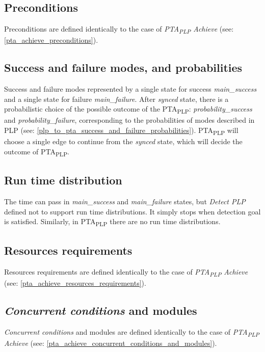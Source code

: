 \subsection{Preconditions}
Preconditions are defined identically to the case of \textit{PTA\textsubscript{PLP} Achieve} (see: \ref{pta_achieve_preconditions}).\\
\subsection{Success and failure modes, and probabilities}
Success and failure modes represented by a single state for success \textcolor{ColorUppaalState}{\textit{main_success}} and a single state for failure \textcolor{ColorUppaalState}{\textit{main_failure}}. After \textcolor{ColorUppaalState}{\textit{synced}} state, there is a probabilistic choice of the possible outcome of the PTA\textsubscript{PLP}: \textcolor{ColorEdgeProbability}{\textit{probability_success}} and \textcolor{ColorEdgeProbability}{\textit{probability_failure}}, corresponding to the probabilities of modes described in PLP (see: \ref{plp_to_pta_success_and_failure_probabilities}). PTA\textsubscript{PLP} will choose a single edge to continue from the \textcolor{ColorUppaalState}{\textit{synced}} state, which will decide the outcome of PTA\textsubscript{PLP}.\\
\subsection{Run time distribution}
The time can pass in \textcolor{ColorUppaalState}{\textit{main_success}} and \textcolor{ColorUppaalState}{\textit{main_failure}} states, but \textit{Detect PLP} defined not to support run time distributions. It simply stops when detection goal is satisfied. Similarly, in PTA\textsubscript{PLP} there are no run time distributions.\\
\subsection{Resources requirements}
Resources requirements are defined identically to the case of \textit{PTA\textsubscript{PLP} Achieve} (see: \ref{pta_achieve_resources_requirements}).\\
\subsection{\textit{Concurrent conditions} and modules}
\textit{Concurrent conditions} and modules are defined identically to the case of \textit{PTA\textsubscript{PLP} Achieve} (see: \ref{pta_achieve_concurrent_conditions_and_modules}).\\
